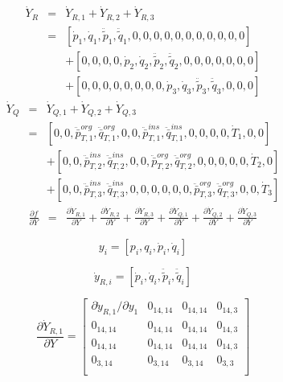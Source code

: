 \documentclass[a4paper,10pt]{article}
\begin{document}
\begin{eqnarray*}
\dot{Y}_R & = & \dot{Y}_{R,1} + \dot{Y}_{R,2} + \dot{Y}_{R,3}\\
          & = & [   \dot{p}_1, \dot{q}_1, \ddot{\tilde{p}}_1, \ddot{\tilde{q}}_1, 0, 0, 0, 0, 0, 0, 0, 0, 0, 0, 0 ]\\
          &   & + [ 0, 0, 0, 0, \dot{p}_2, \dot{q}_2, \ddot{\tilde{p}}_2, \ddot{\tilde{q}}_2, 0, 0, 0, 0, 0, 0, 0 ]\\
          &   & + [ 0, 0, 0, 0, 0, 0, 0, 0, \dot{p}_3, \dot{q}_3, \ddot{\tilde{p}}_3, \ddot{\tilde{q}}_3, 0, 0, 0 ]
\end{eqnarray*}
\begin{eqnarray*}
\dot{Y}_Q & = & \dot{Y}_{Q,1} + \dot{Y}_{Q,2} + \dot{Y}_{Q,3}\\
          & = &   [ 0, 0, \ddot{\bar{p}}_{T,1}^{org}, \ddot{\bar{q}}_{T,1}^{org}, 0, 0, \ddot{\bar{p}}_{T,1}^{ins}, \ddot{\bar{q}}_{T,1}^{ins}, 0, 0, 0, 0, \dot{T}_1, 0, 0 ]\\
          &   & + [ 0, 0, \ddot{\bar{p}}_{T,2}^{ins}, \ddot{\bar{q}}_{T,2}^{ins}, 0, 0, \ddot{\bar{p}}_{T,2}^{org}, \ddot{\bar{q}}_{T,2}^{org}, 0, 0, 0, 0, 0, \dot{T}_2, 0 ]\\
          &   & + [ 0, 0, \ddot{\bar{p}}_{T,3}^{ins}, \ddot{\bar{q}}_{T,3}^{ins}, 0, 0, 0, 0, 0, 0, \ddot{\bar{p}}_{T,3}^{org}, \ddot{\bar{q}}_{T,3}^{org}, 0, 0, \dot{T}_3 ]
\end{eqnarray*}
\begin{eqnarray*}
\frac{\partial f}{\partial Y}
        & = & \frac{\partial\dot{Y}_{R,1}}{\partial Y} + \frac{\partial\dot{Y}_{R,2}}{\partial Y} + \frac{\partial\dot{Y}_{R,3}}{\partial Y}
              + \frac{\partial\dot{Y}_{Q,1}}{\partial Y} + \frac{\partial\dot{Y}_{Q,2}}{\partial Y} + \frac{\partial\dot{Y}_{Q,3}}{\partial Y}
\end{eqnarray*}


\begin{equation}
y_{i} = [p_i, q_i, \dot{p}_i, \dot{q}_i]
\end{equation}

\begin{equation}
\dot{y}_{R,i} = [\dot{p}_i, \dot{q}_i, \ddot{\tilde{p}}_i, \ddot{\tilde{q}}_i]
\end{equation}

\begin{equation}
\frac{\partial\dot{Y}_{R,1}}{\partial Y}=
\left[ \begin{array}{cccc}
\partial \dot{y}_{R,1} / \partial y_1  & 0_{14 , 14} & 0_{14 , 14} & 0_{14 , 3}\\
0_{14 , 14} & 0_{14 , 14} & 0_{14 , 14} & 0_{14 , 3}\\
0_{14 , 14} & 0_{14 , 14} & 0_{14 , 14} & 0_{14 , 3}\\
0_{3 , 14} & 0_{3 , 14} & 0_{3 , 14} & 0_{3 , 3}\\
\end{array} \right]
\end{equation}
\end{document}
